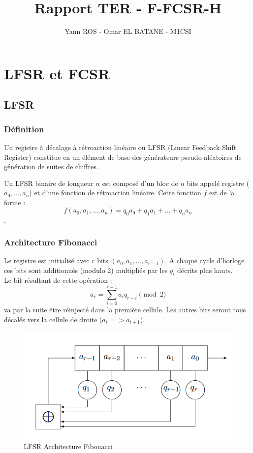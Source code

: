 \documentclass[11pt]{report}
\begin{document}
\author{Yann ROS - Omar EL BATANE - M1CSI}
\title{Rapport TER - F-FCSR-H}
\maketitle

\tableofcontents
\chapter{LFSR et FCSR}
\section{LFSR}
	\subsection{Définition}
	Un registre à décalage à rétroaction linéaire ou LFSR (Linear Feedback Shift Register) constitue en un élément de base des générateurs pseudo-aléatoires de génération de suites de chiffres.
	
	Un LFSR binaire de longueur $n$ est composé d'un bloc de $n$ bits appelé registre  ($a_0,...,a_n$) et d'une fonction de rétroaction linéaire.
	Cette fonction $f$ est de la forme : 
	\[
	f(a_0,a_1,...,a_n)=q_0a_0+q_1a_1+...+q_na_n
	\].
	
	\subsection{Architecture Fibonacci}
	Le registre est initialisé avec $r$ bits $(a_0,a_1,...,a_{r-1})$. A chaque cycle d'horloge ces bits sont additionnés (modulo 2) multipliés par les $q_i$ décrits plus hauts. \\Le bit résultant de cette opération : \\
	\[
	a_r = \sum_{i=0}^{r-1} a_iq_{r-i}\pmod{2}
	\]
	va par la suite être réinjecté dans la première cellule. Les autres bits seront tous décalés vers la cellule de droite ($a_i => a_{i+1}$).
	\begin{figure}[!h]
	\centering
	\includegraphics{FIBOLfsr.png}
	\caption{LFSR Architecture Fibonacci}
	\label{LFSRFibo}
	\end{figure}
	\\
	\\\\\\\\
	
\end{document}
